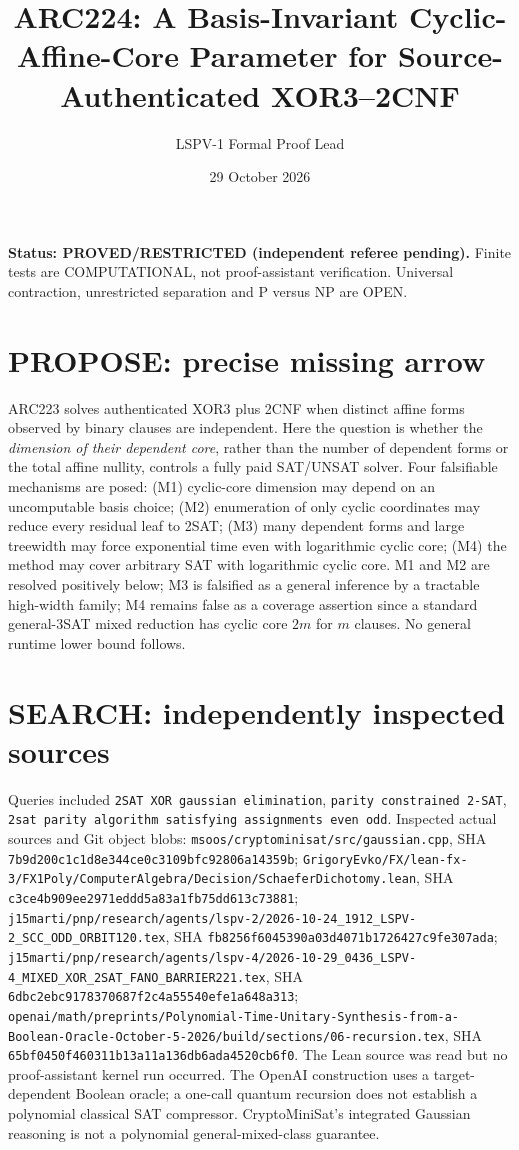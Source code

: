 \documentclass[11pt]{article}
\title{ARC224: A Basis-Invariant Cyclic-Affine-Core Parameter for Source-Authenticated XOR3--2CNF}
\author{LSPV-1 Formal Proof Lead}
\date{29 October 2026}
\begin{document}
\maketitle
\noindent\textbf{Status: PROVED/RESTRICTED (independent referee pending).}
Finite tests are COMPUTATIONAL, not proof-assistant verification.
Universal contraction, unrestricted separation and P versus NP are OPEN.

\section{PROPOSE: precise missing arrow}
ARC223 solves authenticated XOR3 plus 2CNF when distinct affine forms observed by binary clauses are independent. Here the question is whether the \emph{dimension of their dependent core}, rather than the number of dependent forms or the total affine nullity, controls a fully paid SAT/UNSAT solver. Four falsifiable mechanisms are posed: (M1) cyclic-core dimension may depend on an uncomputable basis choice; (M2) enumeration of only cyclic coordinates may reduce every residual leaf to 2SAT; (M3) many dependent forms and large treewidth may force exponential time even with logarithmic cyclic core; (M4) the method may cover arbitrary SAT with logarithmic cyclic core. M1 and M2 are resolved positively below; M3 is falsified as a general inference by a tractable high-width family; M4 remains false as a coverage assertion since a standard general-3SAT mixed reduction has cyclic core $2m$ for $m$ clauses. No general runtime lower bound follows.

\section{SEARCH: independently inspected sources}
Queries included \texttt{2SAT XOR gaussian elimination}, \texttt{parity constrained 2-SAT}, \texttt{2sat parity algorithm satisfying assignments even odd}.
Inspected actual sources and Git object blobs:
\texttt{msoos/cryptominisat/src/gaussian.cpp}, SHA \texttt{7b9d200c1c1d8e344ce0c3109bfc92806a14359b};
\texttt{GrigoryEvko/FX/lean-fx-3/FX1Poly/ComputerAlgebra/Decision/SchaeferDichotomy.lean}, SHA \texttt{c3ce4b909ee2971eddd5a83a1fb75dd613c73881};
\texttt{j15marti/pnp/research/agents/lspv-2/2026-10-24\_1912\_LSPV-2\_SCC\_ODD\_ORBIT120.tex}, SHA \texttt{fb8256f6045390a03d4071b1726427c9fe307ada};
\texttt{j15marti/pnp/research/agents/lspv-4/2026-10-29\_0436\_LSPV-4\_MIXED\_XOR\_2SAT\_FANO\_BARRIER221.tex}, SHA \texttt{6dbc2ebc9178370687f2c4a55540efe1a648a313};
\texttt{openai/math/preprints/Polynomial-Time-Unitary-Synthesis-from-a-Boolean-Oracle-October-5-2026/build/sections/06-recursion.tex}, SHA \texttt{65bf0450f460311b13a11a136db6ada4520cb6f0}.
The Lean source was read but no proof-assistant kernel run occurred. The OpenAI construction uses a target-dependent Boolean oracle; a one-call quantum recursion does not establish a polynomial classical SAT compressor. CryptoMiniSat's integrated Gaussian reasoning is not a polynomial general-mixed-class guarantee.
\end{document}
